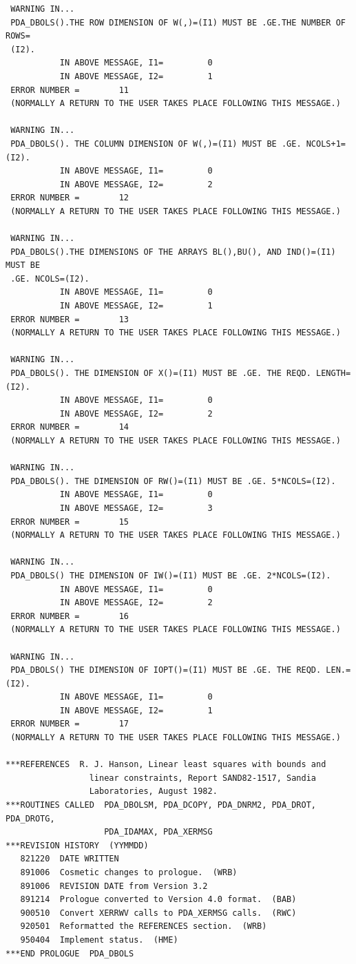\documentclass[11pt,twoside]{article}
\begin{document}
\begin{verbatim}
 WARNING IN...
 PDA_DBOLS().THE ROW DIMENSION OF W(,)=(I1) MUST BE .GE.THE NUMBER OF ROWS=
 (I2).
           IN ABOVE MESSAGE, I1=         0
           IN ABOVE MESSAGE, I2=         1
 ERROR NUMBER =        11
 (NORMALLY A RETURN TO THE USER TAKES PLACE FOLLOWING THIS MESSAGE.)

 WARNING IN...
 PDA_DBOLS(). THE COLUMN DIMENSION OF W(,)=(I1) MUST BE .GE. NCOLS+1=(I2).
           IN ABOVE MESSAGE, I1=         0
           IN ABOVE MESSAGE, I2=         2
 ERROR NUMBER =        12
 (NORMALLY A RETURN TO THE USER TAKES PLACE FOLLOWING THIS MESSAGE.)

 WARNING IN...
 PDA_DBOLS().THE DIMENSIONS OF THE ARRAYS BL(),BU(), AND IND()=(I1) MUST BE
 .GE. NCOLS=(I2).
           IN ABOVE MESSAGE, I1=         0
           IN ABOVE MESSAGE, I2=         1
 ERROR NUMBER =        13
 (NORMALLY A RETURN TO THE USER TAKES PLACE FOLLOWING THIS MESSAGE.)

 WARNING IN...
 PDA_DBOLS(). THE DIMENSION OF X()=(I1) MUST BE .GE. THE REQD. LENGTH=(I2).
           IN ABOVE MESSAGE, I1=         0
           IN ABOVE MESSAGE, I2=         2
 ERROR NUMBER =        14
 (NORMALLY A RETURN TO THE USER TAKES PLACE FOLLOWING THIS MESSAGE.)

 WARNING IN...
 PDA_DBOLS(). THE DIMENSION OF RW()=(I1) MUST BE .GE. 5*NCOLS=(I2).
           IN ABOVE MESSAGE, I1=         0
           IN ABOVE MESSAGE, I2=         3
 ERROR NUMBER =        15
 (NORMALLY A RETURN TO THE USER TAKES PLACE FOLLOWING THIS MESSAGE.)

 WARNING IN...
 PDA_DBOLS() THE DIMENSION OF IW()=(I1) MUST BE .GE. 2*NCOLS=(I2).
           IN ABOVE MESSAGE, I1=         0
           IN ABOVE MESSAGE, I2=         2
 ERROR NUMBER =        16
 (NORMALLY A RETURN TO THE USER TAKES PLACE FOLLOWING THIS MESSAGE.)

 WARNING IN...
 PDA_DBOLS() THE DIMENSION OF IOPT()=(I1) MUST BE .GE. THE REQD. LEN.=(I2).
           IN ABOVE MESSAGE, I1=         0
           IN ABOVE MESSAGE, I2=         1
 ERROR NUMBER =        17
 (NORMALLY A RETURN TO THE USER TAKES PLACE FOLLOWING THIS MESSAGE.)

***REFERENCES  R. J. Hanson, Linear least squares with bounds and
                 linear constraints, Report SAND82-1517, Sandia
                 Laboratories, August 1982.
***ROUTINES CALLED  PDA_DBOLSM, PDA_DCOPY, PDA_DNRM2, PDA_DROT, PDA_DROTG,
                    PDA_IDAMAX, PDA_XERMSG
***REVISION HISTORY  (YYMMDD)
   821220  DATE WRITTEN
   891006  Cosmetic changes to prologue.  (WRB)
   891006  REVISION DATE from Version 3.2
   891214  Prologue converted to Version 4.0 format.  (BAB)
   900510  Convert XERRWV calls to PDA_XERMSG calls.  (RWC)
   920501  Reformatted the REFERENCES section.  (WRB)
   950404  Implement status.  (HME)
***END PROLOGUE  PDA_DBOLS
\end{verbatim}
\end{document}
